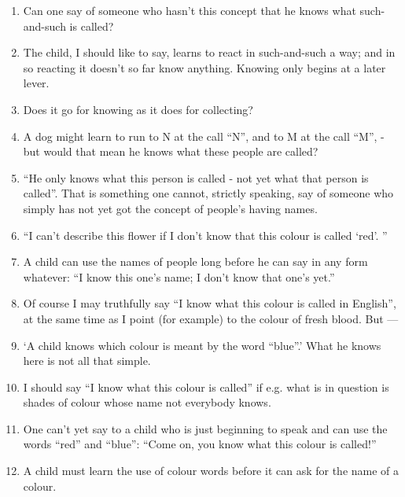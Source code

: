 \documentclass{book}
\begin{document}
\begin{enumerate}
\item
Can one say of someone who hasn't this concept that he knows what such-and-such
is called?

\item
The child, I should like to say, learns to react in such-and-such a way; and in
so reacting it doesn't so far know anything. Knowing only begins at a later
lever.

\item
Does it go for knowing as it does for collecting?

\item
A dog might learn to run to N at the call ``N'', and to M at the call ``M'', -
but would that mean he knows what these people are called?

\item
``He only knows what this person is called - not yet what that person is
called''. That is something one cannot, strictly speaking, say of someone who
simply has not yet got the concept of people's having names.

\item
``I can't describe this flower if I don't know that this colour is called
`red'. ''

\item
A child can use the names of people long before he can say in any form
whatever: ``I know this one's name; I don't know that one's yet.''

\item
Of course I may truthfully say ``I know what this colour is called in
English'', at the same time as I point (for example) to the colour of fresh
blood. But ---

\item
`A child knows which colour is meant by the word ``blue''.' What he knows here
is not all that simple.

\item
I should say ``I know what this colour is called'' if e.g. what is in question
is shades of colour whose name not everybody knows.

\item
One can't yet say to a child who is just beginning to speak and can use the
words ``red'' and ``blue'': ``Come on, you know what this colour is called!''

\item
A child must learn the use of colour words before it can ask for the name of a
colour.


\end{enumerate}
\end{document}
